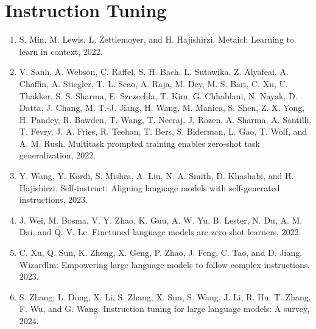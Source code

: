 \documentclass[]{article}
\begin{document}
\section{Instruction Tuning}
\begin{enumerate}
\item S. Min, M. Lewis, L. Zettlemoyer, and H. Hajishirzi. Metaicl: Learning to learn in context, 2022.
\item V. Sanh, A. Webson, C. Raffel, S. H. Bach, L. Sutawika, Z. Alyafeai, A. Chaffin, A. Stiegler, T. L. Scao,
A. Raja, M. Dey, M. S. Bari, C. Xu, U. Thakker, S. S. Sharma, E. Szczechla, T. Kim, G. Chhablani,
N. Nayak, D. Datta, J. Chang, M. T.-J. Jiang, H. Wang, M. Manica, S. Shen, Z. X. Yong, H. Pandey,
R. Bawden, T. Wang, T. Neeraj, J. Rozen, A. Sharma, A. Santilli, T. Fevry, J. A. Fries, R. Teehan,
T. Bers, S. Biderman, L. Gao, T. Wolf, and A. M. Rush. Multitask prompted training enables zero-shot
task generalization, 2022.
\item Y. Wang, Y. Kordi, S. Mishra, A. Liu, N. A. Smith, D. Khashabi, and H. Hajishirzi. Self-instruct:
Aligning language models with self-generated instructions, 2023.
\item J. Wei, M. Bosma, V. Y. Zhao, K. Guu, A. W. Yu, B. Lester, N. Du, A. M. Dai, and Q. V. Le. Finetuned
language models are zero-shot learners, 2022.
\item C. Xu, Q. Sun, K. Zheng, X. Geng, P. Zhao, J. Feng, C. Tao, and D. Jiang. Wizardlm: Empowering
large language models to follow complex instructions, 2023.
\item S. Zhang, L. Dong, X. Li, S. Zhang, X. Sun, S. Wang, J. Li, R. Hu, T. Zhang, F. Wu, and G. Wang.
Instruction tuning for large language models: A survey, 2024.


\end{enumerate}
\end{document}
